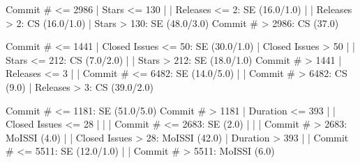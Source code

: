 Commit # <= 2986
|   Stars <= 130
|   |   Releases <= 2: SE (16.0/1.0)
|   |   Releases > 2: CS (16.0/1.0)
|   Stars > 130: SE (48.0/3.0)
Commit # > 2986: CS (37.0)



Commit # <= 1441
|   Closed Issues <= 50: SE (30.0/1.0)
|   Closed Issues > 50
|   |   Stars <= 212: CS (7.0/2.0)
|   |   Stars > 212: SE (18.0/1.0)
Commit # > 1441
|   Releases <= 3
|   |   Commit # <= 6482: SE (14.0/5.0)
|   |   Commit # > 6482: CS (9.0)
|   Releases > 3: CS (39.0/2.0)



Commit # <= 1181: SE (51.0/5.0)
Commit # > 1181
|   Duration <= 393
|   |   Closed Issues <= 28
|   |   |   Commit # <= 2683: SE (2.0)
|   |   |   Commit # > 2683: MoISSI (4.0)
|   |   Closed Issues > 28: MoISSI (42.0)
|   Duration > 393
|   |   Commit # <= 5511: SE (12.0/1.0)
|   |   Commit # > 5511: MoISSI (6.0)